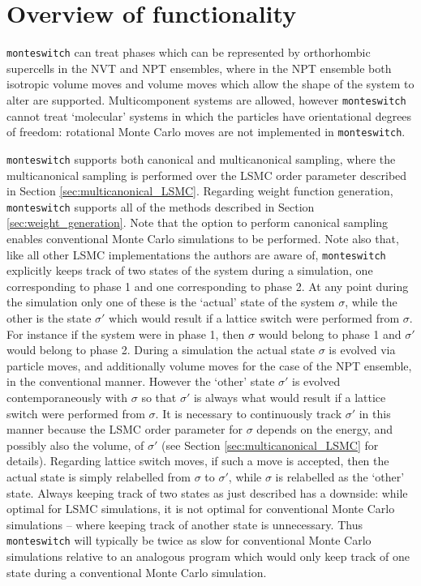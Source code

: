 \documentclass{report}
\begin{document}
\section{Overview of functionality}
\texttt{monteswitch} can treat phases which can be represented by orthorhombic supercells in the NVT and NPT ensembles, where in the
NPT ensemble both isotropic volume moves and volume moves which allow the shape of the system to alter are supported. Multicomponent
systems are allowed, however \texttt{monteswitch} cannot treat `molecular' systems in which the particles have orientational degrees of
freedom: rotational Monte Carlo moves are not implemented in \texttt{monteswitch}.

\texttt{monteswitch} supports both canonical and multicanonical sampling, where the multicanonical
sampling is performed over the LSMC order parameter described in Section \ref{sec:multicanonical_LSMC}.
Regarding weight function generation, \texttt{monteswitch} supports all of the methods described in Section \ref{sec:weight_generation}. 
Note that the option to perform canonical sampling enables conventional Monte Carlo simulations to be performed. 
Note also that, like all other LSMC implementations the authors are aware of, \texttt{monteswitch} explicitly keeps track of two states of 
the system during a simulation, one corresponding to phase 1 and one corresponding to phase 2. At any point during the simulation only one 
of these is the `actual' state of the system $\sigma$, while the other is the state $\sigma'$ which would result if a lattice switch were
performed from $\sigma$. For instance if the system were in phase 1, then $\sigma$ would belong to phase 1 and $\sigma'$ would belong to 
phase 2. During a simulation the actual state $\sigma$ is evolved via particle moves, and additionally volume moves for the case of the NPT ensemble, 
in the conventional manner. However the `other' state $\sigma'$ is evolved contemporaneously with $\sigma$ so that $\sigma'$ is always what 
would result if a lattice switch were performed from $\sigma$. It is necessary to continuously track $\sigma'$ in this manner because the LSMC order 
parameter for $\sigma$ depends on the energy, and possibly also the volume, of $\sigma'$ (see Section \ref{sec:multicanonical_LSMC} for details). 
Regarding lattice switch moves, if such a move is accepted, then the actual state is simply relabelled from $\sigma$ to $\sigma'$, while $\sigma$ is 
relabelled as the `other' state. Always keeping track of two states as just described has a downside: while optimal for LSMC simulations, 
it is not optimal for conventional Monte Carlo simulations -- where keeping track of another state is unnecessary. Thus \texttt{monteswitch} will 
typically be twice as slow for conventional Monte Carlo simulations relative to an analogous program which would only keep track of one state during 
a conventional Monte Carlo simulation.
\end{document}
